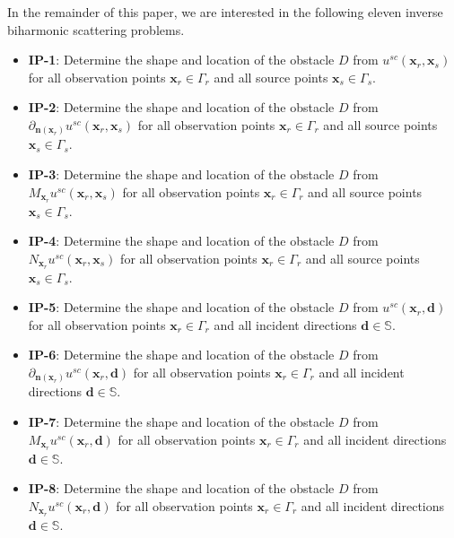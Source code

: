 \documentclass[10pt,a4paper]{article}
\numberwithin{equation}{section}
\begin{document}
In the remainder of  this  paper,  we  are  interested in the 
following eleven inverse biharmonic scattering problems.
\begin{itemize}
\item \textbf{IP-1}: Determine the shape and location of  the obstacle $D$
  from
  $u^{sc}(\bm{ x }_r, \bm{ x }_s)$
  for all observation points $\bm{ x }_r \in \Gamma_r$ and all source points $\bm{ x }_s \in \Gamma_s$.
  
\item \textbf{IP-2}: Determine the shape and location of  the obstacle $D$
  from $\partial_{\bm{n}(\bm{ x }_{r}) } u^{sc}(\bm{ x }_r, \bm{ x }_s)$
  for all observation points $\bm{ x }_r \in \Gamma_r$ and all source points $\bm{ x }_s \in \Gamma_s$.
  
  \item \textbf{IP-3}: Determine the shape and location of the obstacle $D$
    from 
    $M_{\bm{ x }_r} u^{sc}(\bm{ x }_r, \bm{ x }_s)$
  for all observation points $\bm{ x }_r \in \Gamma_r$ and all source points $\bm{ x }_s \in \Gamma_s$.
  
  \item \textbf{IP-4}: Determine the shape and location of the obstacle $D$
    from 
    $N_{\bm{ x }_r} u^{sc}(\bm{ x }_r, \bm{ x }_s)$
  for all observation points $\bm{ x }_r \in \Gamma_r$ and all source points $\bm{ x }_s \in \Gamma_s$.
  
  \item \textbf{IP-5}: Determine the shape and location of the obstacle $D$
    from 
    $u^{sc}(\bm{ x }_r, \bm{ d })$
  for all observation points $\bm{ x }_r \in \Gamma_r$ and all incident directions $\bm{ d } \in \mathbb{S}$.
  
  \item \textbf{IP-6}: Determine the shape and location of the obstacle $D$
    from 
    $\partial_{\bm{n}(\bm{ x }_{r}) } u^{sc}(\bm{ x }_r,  \bm{ d })$
  for all observation points $\bm{ x }_r \in \Gamma_r$ and  all incident directions $\bm{ d } \in \mathbb{S}$.
  
  \item \textbf{IP-7}: Determine the shape and location of the obstacle $D$
    from 
    $M_{\bm{ x }_r} u^{sc}(\bm{ x }_r,  \bm{ d })$
  for all observation points $\bm{ x }_r \in \Gamma_r$ and  all incident directions $\bm{ d } \in \mathbb{S}$.
  
  \item \textbf{IP-8}: Determine the shape and location of  the obstacle $D$
    from 
    $N_{\bm{ x }_r} u^{sc}(\bm{ x }_r,  \bm{ d })$
  for all observation points $\bm{ x }_r \in \Gamma_r$ and  all incident directions $\bm{ d } \in \mathbb{S}$.
  

\end{itemize}
\end{document}
